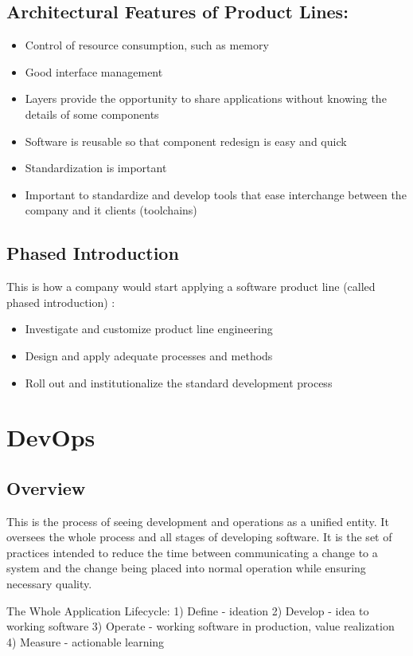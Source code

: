 \documentclass[a4paper]{report}
\begin{document}
\section{Architectural Features of Product Lines:}
\begin{itemize}
\item Control of resource consumption, such as memory
\item Good interface management
\item Layers provide the opportunity to share applications without knowing the details of some components
\item Software is reusable so that component redesign is easy and quick
\item Standardization is important
\item Important to standardize and develop tools that ease interchange between the company and it clients (toolchains)
\end{itemize}

\section{Phased Introduction}
This is how a company would start applying a software product line (called phased introduction) :
\begin{itemize}
\item Investigate and customize product line engineering
\item Design and apply adequate processes and methods
\item Roll out and institutionalize the standard development process
\end{itemize}

\chapter{DevOps}
\section{Overview}
This is the process of seeing development and operations as a unified entity. It oversees the whole process and all stages of developing software. It is the set of practices intended to reduce the time between communicating a change to a system and the change being placed into normal operation while ensuring necessary quality. 

The Whole Application Lifecycle:
1)  Define - ideation
2)  Develop - idea to working software
3)  Operate - working software in production, value realization
4)  Measure - actionable learning
\end{document}

